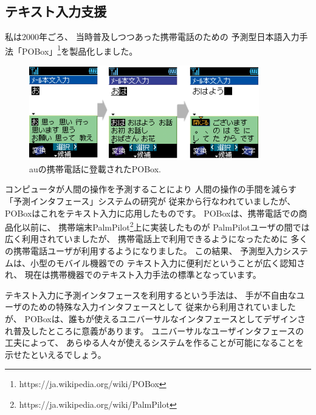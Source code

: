 \documentclass[topics]{compsoft} %
\begin{document}
\subsection{テキスト入力支援}

私は2000年ごろ、
当時普及しつつあった携帯電話のための
予測型日本語入力手法「POBox」\footnote{
  \textsf{https:{\slash}{\slash}ja.wikipedia.org{\slash}wiki{\slash}POBox}
}を製品化しました。

\begin{figure}[h]
  \includegraphics[width=10cm,bb=0 0 404 167]{figures/ac2b347a7042f920edd576ee07c4b7f4.png}
  \caption{auの携帯電話に登載されたPOBox.}
  \label{pobox}
\end{figure}

コンピュータが人間の操作を予測することにより
人間の操作の手間を減らす「予測インタフェース」システムの研究が
従来から行なわれていましたが\cite{WatchWhatIDo}\cite{YourWish}、
POBoxはこれをテキスト入力に応用したものです。
%
POBoxは、携帯電話での商品化以前に、
携帯端末PalmPilot\footnote{
  \textsf{https:{\slash}{\slash}ja.wikipedia.org{\slash}wiki{\slash}PalmPilot}
}上に実装したものが
PalmPilotユーザの間では広く利用されていましたが、
携帯電話上で利用できるようになったために
多くの携帯電話ユーザが利用するようになりました。
この結果、
予測型入力システムは、小型のモバイル機器での
テキスト入力に便利だということが広く認知され、
現在は携帯機器でのテキスト入力手法の標準となっています。

テキスト入力に予測インタフェースを利用するという手法は、
手が不自由なユーザのための特殊な入力インタフェースとして
従来から利用されていましたが、
POBoxは、誰もが使えるユニバーサルなインタフェースとしてデザインされ普及したところに意義があります。
ユニバーサルなユーザインタフェースの工夫によって、
あらゆる人々が使えるシステムを作ることが可能になることを示せたといえるでしょう。
\end{document}
